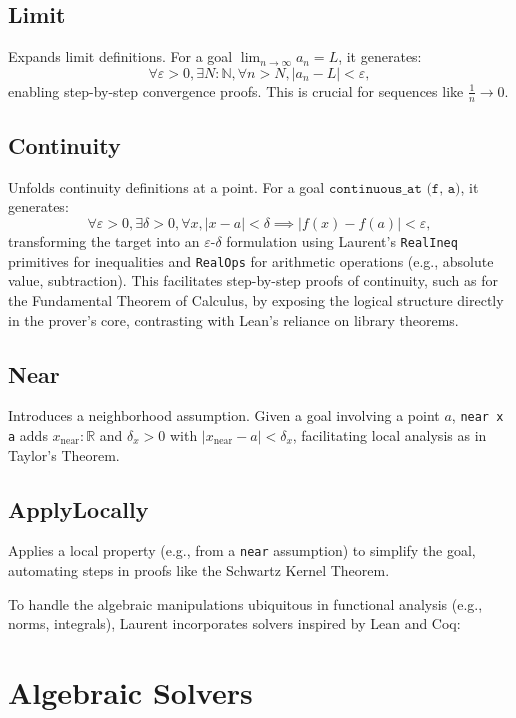 \documentclass[12pt,twoside,draft]{cmpart}
\begin{document}
\subsection{Limit}
Expands limit definitions. For a goal $\lim_{n \to \infty} a_n = L$, it generates:
\[
\forall \varepsilon > 0, \exists N : \mathbb{N}, \forall n > N, |a_n - L| < \varepsilon,
\]
enabling step-by-step convergence proofs. This is crucial for sequences like $\frac{1}{n} \to 0$.

\subsection{Continuity}
Unfolds continuity definitions at a point. For a goal \( \texttt{continuous\_at (f, a)} \), it generates:
\[
\forall \varepsilon > 0, \exists \delta > 0, \forall x, |x - a| < \delta \implies |f(x) - f(a)| < \varepsilon,
\]
transforming the target into an \(\varepsilon\)-$\delta$ formulation
using Laurent’s \texttt{RealIneq} primitives for inequalities and
\texttt{RealOps} for arithmetic operations (e.g., absolute value,
subtraction). This facilitates step-by-step proofs of continuity,
such as for the Fundamental Theorem of Calculus, by exposing the
logical structure directly in the prover’s core, contrasting with
Lean’s reliance on library theorems.

\subsection{Near}
Introduces a neighborhood assumption. Given a goal involving a
point $a$, \texttt{near x a} adds $x_{\text{near}} : \mathbb{R}$
and $\delta_x > 0$ with $|x_{\text{near}} - a| < \delta_x$,
facilitating local analysis as in Taylor’s Theorem.

\subsection{ApplyLocally}
Applies a local property (e.g., from a \texttt{near} assumption) to
simplify the goal, automating steps in proofs like the Schwartz Kernel Theorem.

To handle the algebraic manipulations ubiquitous in functional analysis (e.g., norms, integrals),
Laurent incorporates solvers inspired by Lean and Coq:


\section{Algebraic Solvers}
\end{document}
